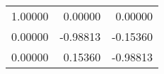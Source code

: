 \begin{tabular}{rrr}
\toprule
1.00000 &  0.00000 &  0.00000 \\
0.00000 & -0.98813 & -0.15360 \\
0.00000 &  0.15360 & -0.98813 \\
\bottomrule
\end{tabular}
